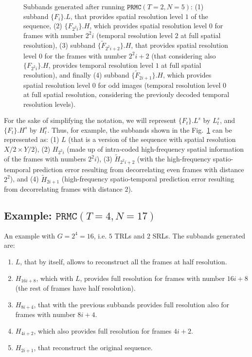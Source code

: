 \begin{figure}
  \centering
  \caption{Subbands generated after running $\mathtt{PRMC}(T=2, N=5)$:
    (1) subband $\{F_i\}.L$, that provides spatial resolution level
    $1$ of the sequence, (2) $\{F_{2^2i}\}.H$, which provides spatial
    resolution level $0$ for frames with number $2^2i$ (temporal
    resolution level $2$ at full spatial resolution), (3) subband
    $\{{\tilde F}_{2^2i+2}\}.H$, that provides spatial resolution
    level $0$ for the frames with number $2^2i+2$ (that considering
    also $\{F_{2^2i}\}.H$, provides temporal resolution level $1$ at
    full spatial resolution), and finally (4) subband $\{{\tilde
      F}_{2i+1}\}.H$, which provides spatial resolution level $0$ for
    odd images (temporal resolution level $0$ at full spatial
    resolution, considering the previouly decoded temporal resolution
    levels).}
  \label{fig:1xPRMC2}
\end{figure}

For the sake of simplifying the notation, we will represent
$\{F_t\}.L^s$ by $L_t^s$, and $\{F_t\}.H^s$ by $H_t^s$. Thus, for
example, the subbands shown in the Fig.~\ref{fig:1xPRMC2} can be
represented as: (1) $L$ (that is a version of the sequence with
spatial resolution $X/2\times Y/2$), (2) $H_{2^2i}$ (made up of
intra-coded high-frequency spatial information of the frames with
numbers $2^2i$), (3) $\tilde{H}_{2^2i+2}$ (with the high-frequency
spatio-temporal prediction error resulting from decorrelating even
frames with distance $2^2$), and (4) $\tilde{H}_{2i+1}$
(high-frequency spatio-temporal prediction error resulting from
decorrelating frames with distance $2$).


\subsection*{Example: $\mathtt{PRMC}(T=4, N=17)$}

An example with $G=2^4=16$, i.e. $5$ TRLs and $2$ SRLs. The subbands
generated are:
\begin{enumerate}
\item $L$, that by itself, allows to reconstruct all the frames at
  half resolution.
\item $H_{16i+8}$, which with $L$, provides full resolution for frames
  with number $16i+8$ (the rest of frames have half resolution).
\item $H_{8i+4}$, that with the previous subbands provides full
  resolution also for frames with number $8i+4$.
\item $H_{4i+2}$, which also provides full resolution for frames $4i+2$.
\item $H_{2i+1}$, that reconstruct the original sequence.
\end{enumerate}

